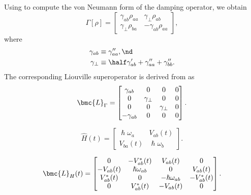 Using  to compute the von Neumann form of the damping operator, we obtain
 \begin{equation}
 \Gamma[\rho] = \begin{bmatrix}
 \gamma_{a b} \rho_{a a} & \gamma_\perp \rho_{a b} \\
 \gamma_\perp \rho_{b a} & -\gamma_{a b} \rho_{a a}
 \end{bmatrix} ,
 \end{equation}
where
 \begin{subequations}
 \begin{align}
\gamma_{a b} &\equiv \gamma^{\prime \prime}_{a a} , \nd \\
\gamma_\perp &\equiv \half \gamma^{\prime}_{a b} + \gamma^{\prime \prime}_{a a} + \gamma^{\prime \prime}_{b b} .
 \end{align}
 \end{subequations}
The corresponding Liouville superoperator is derived from  as
 \begin{equation}
\bmc{L}_\Gamma = \begin{bmatrix}
 \gamma_{a b} & 0 & 0 & 0 \\
 0 & \gamma_\perp & 0 & 0 \\
 0 & 0 & \gamma_\perp & 0 \\
 -\gamma_{a b} & 0 & 0 & 0
 \end{bmatrix} .
 \end{equation}

 \begin{equation}
\hat{H}(t) = \begin{bmatrix}
 \hslash \omega_a & V_{a b}(t) \\
 V_{b a}(t) & \hslash \omega_b
 \end{bmatrix} .
 \end{equation}


 \begin{equation}
\bmc{L}_H(t) = \begin{bmatrix}
 0 & -V^\ast_{a b}(t) & V_{a b}(t) & 0 \\
 -V_{a b}(t) & \hslash \omega_{a b} & 0 & V_{a b}(t) \\
 V^\ast_{a b}(t) & 0 & -\hslash \omega_{a b} & -V^\ast_{a b}(t) \\
 0 & V^\ast_{a b}(t) & -V_{a b}(t) & 0
 \end{bmatrix} .
 \end{equation}

